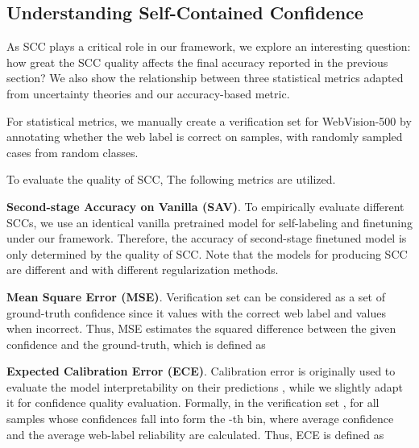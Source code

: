 \documentclass[runningheads]{llncs}
\begin{document}
\subsection{Understanding Self-Contained Confidence}
\label{S:exp-conf}
As SCC plays a critical role in our framework, we explore an interesting question: 
how great the SCC quality affects the final accuracy reported in the previous section? We also show the relationship between three statistical metrics adapted from uncertainty theories and our accuracy-based metric. 

For statistical metrics, we manually create a verification set  for WebVision-500 by annotating whether the web label is correct on  samples, with  randomly sampled cases from  random classes. 


To evaluate the quality of SCC, The following metrics are utilized.

\textbf{Second-stage Accuracy on Vanilla (SAV)}. 
To empirically evaluate different SCCs, we use an identical vanilla pretrained model for self-labeling and finetuning under our framework. Therefore, the accuracy of second-stage finetuned model is only determined by the quality of SCC. Note that the models for producing SCC are different and with different regularization methods.
	
\textbf{Mean Square Error (MSE)}. Verification set  can be considered as a set of ground-truth confidence since it values  with the correct web label and values  when incorrect. Thus, MSE estimates the squared difference between the given confidence and the ground-truth, which is defined as 


\textbf{Expected Calibration Error (ECE)}. Calibration error is originally used to evaluate the model interpretability on their predictions \cite{guo2017calibration}, while we slightly adapt it for confidence quality evaluation. 
Formally, in the verification set , for all samples whose confidences fall into  form the -th bin, where average confidence  and the average web-label reliability  are calculated. Thus, ECE is defined as
\end{document}
